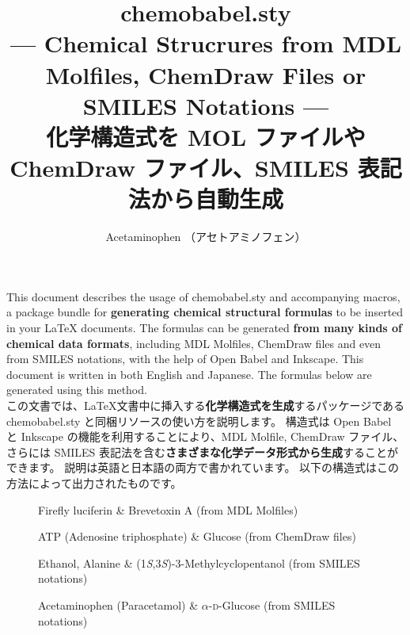 \documentclass[12pt]{jsarticle}
\title{\textsf{chemobabel.sty} \\[1ex] \normalsize --- Chemical Strucrures from MDL Molfiles, ChemDraw Files or SMILES Notations --- \\ 化学構造式を MOL ファイルや ChemDraw ファイル、SMILES 表記法から自動生成}
\author{Acetaminophen （アセトアミノフェン）}
\begin{document}
\renewcommand{\figurename}{Fig.\,}
\maketitle

This document describes the usage of \textsf{chemobabel.sty} and accompanying macros, a package bundle for \textbf{generating chemical structural formulas} to be inserted in your {\LaTeX} documents.
The formulas can be generated \textbf{from many kinds of chemical data formats}, including MDL Molfiles, ChemDraw files and even from SMILES notations, with the help of Open Babel and Inkscape.
This document is written in both English and Japanese.
The formulas below are generated using this method. \\

この文書では、\LaTeX 文書中に挿入する\textbf{化学構造式を生成}するパッケージである \textsf{chemobabel.sty} と同梱リソースの使い方を説明します。
構造式は Open Babel と Inkscape の機能を利用することにより、MDL Molfile, ChemDraw ファイル、さらには SMILES 表記法を含む\textbf{さまざまな化学データ形式から生成}することができます。
説明は英語と日本語の両方で書かれています。
以下の構造式はこの方法によって出力されたものです。 \\

\begin{figure}[ht]
  \centering
  \caption{Firefly luciferin \& Brevetoxin A (from MDL Molfiles)}
\end{figure}

\begin{figure}[ht]
  \centering
  \caption{ATP (Adenosine triphosphate) \& Glucose (from ChemDraw files)}
\end{figure}

\begin{figure}[ht]
  \centering
  \caption{Ethanol, Alanine \& (1\textit{S},3\textit{S})-3-Methylcyclopentanol (from SMILES notations)}
\end{figure}

\begin{figure}[ht]
  \centering
  \caption{Acetaminophen (Paracetamol) \& $\alpha$-\textsc{d}-Glucose (from SMILES notations)}
\end{figure}
\end{document}
